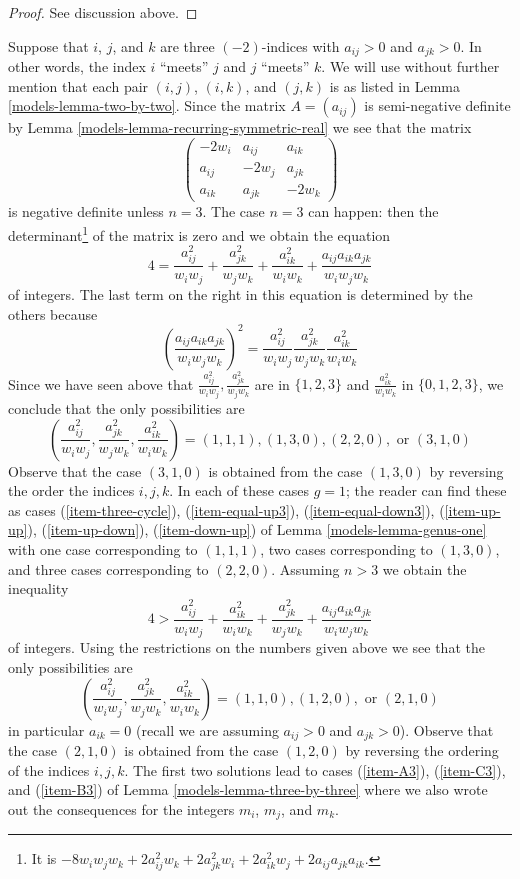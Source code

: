 \begin{proof}
See discussion above.
\end{proof}

Suppose that $i$, $j$, and $k$ are three $(-2)$-indices with $a_{ij} > 0$
and $a_{jk} > 0$.  In other words, the index $i$ ``meets'' $j$ and
$j$ ``meets'' $k$. We will use without further mention that each pair
$(i, j)$, $(i, k)$, and $(j, k)$ is as listed in Lemma \ref{models-lemma-two-by-two}.
Since the matrix $A = (a_{ij})$ is semi-negative
definite by Lemma \ref{models-lemma-recurring-symmetric-real} we see that the matrix
$$
\left(
\begin{matrix}
-2w_i & a_{ij} & a_{ik} \\
a_{ij} & -2w_j & a_{jk} \\
a_{ik} & a_{jk} & -2w_k
\end{matrix}
\right)
$$
is negative definite unless $n = 3$. The case $n = 3$ can happen:
then the determinant\footnote{It is
$-8w_iw_jw_k + 2a_{ij}^2w_k + 2a_{jk}^2w_i + 2a_{ik}^2w_j +
2a_{ij}a_{jk}a_{ik}$.} of the matrix is zero
and we obtain the equation
$$
4 = \frac{a_{ij}^2}{w_iw_j} +
\frac{a_{jk}^2}{w_jw_k} +
\frac{a_{ik}^2}{w_iw_k} +
\frac{a_{ij}a_{ik}a_{jk}}{w_iw_jw_k}
$$
of integers. The last term on the right in this equation is determined
by the others because
$$
\left(\frac{a_{ij}a_{ik}a_{jk}}{w_iw_jw_k}\right)^2 =
\frac{a_{ij}^2}{w_iw_j} \frac{a_{jk}^2}{w_jw_k} \frac{a_{ik}^2}{w_iw_k}
$$
Since we have seen above that
$\frac{a_{ij}^2}{w_iw_j}, \frac{a_{jk}^2}{w_jw_k}$ are in
$\{1, 2, 3\}$ and $\frac{a_{ik}^2}{w_iw_k}$ in $\{0, 1, 2, 3\}$,
we conclude that the only possibilities are
$$
(\frac{a_{ij}^2}{w_iw_j}, \frac{a_{jk}^2}{w_jw_k}, \frac{a_{ik}^2}{w_iw_k}) =
(1, 1, 1), (1, 3, 0), (2, 2, 0),\text{ or } (3, 1, 0)
$$
Observe that the case $(3, 1, 0)$ is obtained from the case $(1, 3, 0)$
by reversing the order the indices $i, j, k$.
In each of these cases $g = 1$; the reader can find these as cases
(\ref{item-three-cycle}), (\ref{item-equal-up3}), (\ref{item-equal-down3}),
(\ref{item-up-up}), (\ref{item-up-down}), (\ref{item-down-up}) of
Lemma \ref{models-lemma-genus-one}
with one case corresponding to $(1, 1, 1)$,
two cases corresponding to $(1, 3, 0)$, and
three cases corresponding to $(2, 2, 0)$.
Assuming $n > 3$
we obtain the inequality
$$
4 > \frac{a_{ij}^2}{w_iw_j} + \frac{a_{ik}^2}{w_iw_k} +
\frac{a_{jk}^2}{w_jw_k} + \frac{a_{ij}a_{ik}a_{jk}}{w_iw_jw_k}
$$
of integers. Using the restrictions on the numbers given above
we see that the only possibilities are
$$
(\frac{a_{ij}^2}{w_iw_j}, \frac{a_{jk}^2}{w_jw_k}, \frac{a_{ik}^2}{w_iw_k}) =
(1, 1, 0), (1, 2, 0),\text{ or }(2, 1, 0)
$$
in particular $a_{ik} = 0$ (recall we are assuming
$a_{ij} > 0$ and $a_{jk} > 0$). Observe that the case
$(2, 1, 0)$ is obtained from the case $(1, 2, 0)$ by reversing
the ordering of the indices $i, j, k$. The first two solutions lead
to cases (\ref{item-A3}), (\ref{item-C3}), and (\ref{item-B3})
of Lemma \ref{models-lemma-three-by-three} where we also wrote out the consequences
for the integers $m_i$, $m_j$, and $m_k$.

